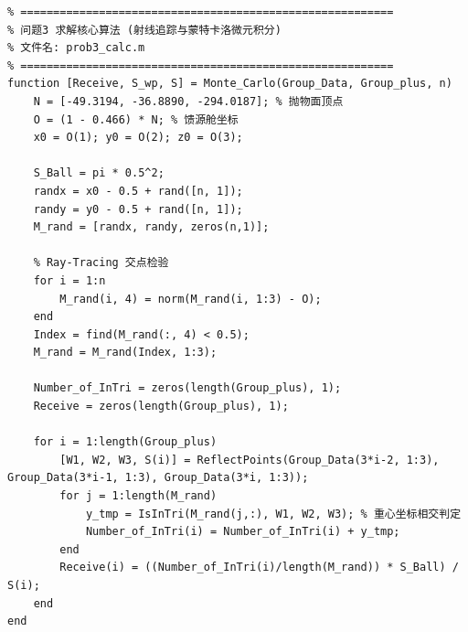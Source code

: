 \documentclass[UTF8,a4paper,zihao=-4]{ctexart}
\begin{document}
\begin{lstlisting}
% =========================================================
% 问题3 求解核心算法 (射线追踪与蒙特卡洛微元积分)
% 文件名: prob3_calc.m
% =========================================================
function [Receive, S_wp, S] = Monte_Carlo(Group_Data, Group_plus, n)
    N = [-49.3194, -36.8890, -294.0187]; % 抛物面顶点
    O = (1 - 0.466) * N; % 馈源舱坐标
    x0 = O(1); y0 = O(2); z0 = O(3);
    
    S_Ball = pi * 0.5^2;
    randx = x0 - 0.5 + rand([n, 1]);
    randy = y0 - 0.5 + rand([n, 1]);
    M_rand = [randx, randy, zeros(n,1)];
    
    % Ray-Tracing 交点检验
    for i = 1:n
        M_rand(i, 4) = norm(M_rand(i, 1:3) - O);
    end
    Index = find(M_rand(:, 4) < 0.5);
    M_rand = M_rand(Index, 1:3);
    
    Number_of_InTri = zeros(length(Group_plus), 1);
    Receive = zeros(length(Group_plus), 1);
    
    for i = 1:length(Group_plus)
        [W1, W2, W3, S(i)] = ReflectPoints(Group_Data(3*i-2, 1:3), Group_Data(3*i-1, 1:3), Group_Data(3*i, 1:3));
        for j = 1:length(M_rand)
            y_tmp = IsInTri(M_rand(j,:), W1, W2, W3); % 重心坐标相交判定
            Number_of_InTri(i) = Number_of_InTri(i) + y_tmp;
        end
        Receive(i) = ((Number_of_InTri(i)/length(M_rand)) * S_Ball) / S(i);
    end
end
\end{lstlisting}
\end{document}
